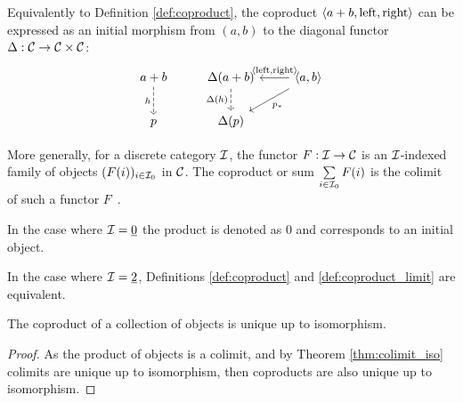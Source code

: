 \begin{definition}
	Equivalently to Definition \ref{def:coproduct}, the coproduct $\langle a+b,
	\mathrm{left}, \mathrm{right}\rangle$ can be expressed as an initial morphism from
	$(a,b)$ to the diagonal functor $\Delta: \mathcal{C} \to \mathcal{C}\times \mathcal{C}$:
	\[\begin{tikzcd}[ampersand replacement=\&]
		{a+b} \& {\Delta(a+b)} \& {\<a,b\>} \\
		p \& {\Delta(p)}
		\arrow["h"', dashed, from=1-1, to=2-1]
		\arrow["{\Delta(h)}"', dashed, from=1-2, to=2-2]
		\arrow["{\<\mathrm{left}, \mathrm{right}\>}"', from=1-3, to=1-2]
		\arrow["{p_*}", from=1-3, to=2-2]
	\end{tikzcd}\]
\end{definition}

\begin{definition}
	More generally, for a discrete category $\mathcal{I}$, the functor $F:\mathcal{I}\to \mathcal{C}$ is an
	$\mathcal{I}$-indexed family of objects $(F(i))_{i\in \mathcal{I}_0}$ in $\mathcal{C}$. The coproduct or
	sum $\sum\limits_{i\in \mathcal{I}_0} F(i)$ is the colimit of such a functor
	$F$~\parencite{leinster:basic_category_theory}.
\end{definition}

\begin{remark}
	In the case where $\mathcal{I}=\underline{0}$ the product is denoted as $0$ and
	corresponds to an initial object.
\end{remark}

\begin{remark}
	In the case where $\mathcal{I}=\underline{2}$, Definitions \ref{def:coproduct} and
	\ref{def:coproduct_limit} are equivalent.
\end{remark}

\begin{theorem}
	The coproduct of a collection of objects is unique up to isomorphism.

	\begin{proof}
		As the product of objects is a colimit, and by Theorem \ref{thm:colimit_iso}
		colimits are unique up to isomorphism, then coproducts are also unique up to
		isomorphism.
	\end{proof}
\end{theorem}